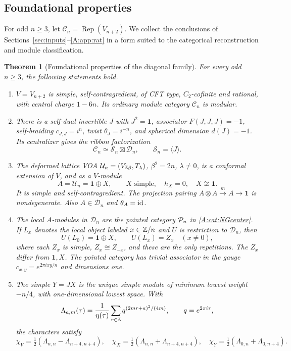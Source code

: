 \documentclass[11pt]{article}
\newtheorem{theorem}{Theorem}[section]
\newcommand{\one}{\mathbf1}\newcommand{\D}{\mathcal D}\newcommand{\Dcat}{\mathcal D}
\newcommand{\Scat}{\mathcal S}\newcommand{\U}{\mathcal U}\newcommand{\bo}{\boxtimes}
\numberwithin{equation}{section}
\begin{document}
\subsection{Foundational properties}\label{A:cat:inputs}
For odd $n\geq3$, let $\mathcal C_n=\operatorname{Rep}(V_{n+2})$. We collect the conclusions of Sections~\ref{sec:inputs}--\ref{A:app:rat} in a form suited to the categorical reconstruction and module classification.
\begin{theorem}[Foundational properties of the diagonal family]\label{E:foundations}
For every odd $n\geq3$, the following statements hold.
\begin{enumerate}[label=(H\arabic*),leftmargin=11mm,itemsep=5pt]
\item $V=V_{n+2}$ is simple, self-contragredient, of CFT type, $C_2$-cofinite and rational, with central charge $1-6n$. Its ordinary module category $\mathcal C_n$ is modular.
\item There is a self-dual invertible $J$ with $J^2=\one$, associator $F(J,J,J)=-1$, self-braiding $c_{J,J}=i^n$, twist $\theta_J=i^{-n}$, and spherical dimension $d(J)=-1$. Its centralizer gives the ribbon factorization
\[
 \mathcal C_n\simeq\Scat_n\bo\D_n,\qquad \Scat_n=\langle J\rangle.
\]
\item The deformed lattice VOA $\mathcal U_n=(V_{\mathbb Z\beta},T_\lambda)$, $\beta^2=2n$, $\lambda\ne0$, is a conformal extension of $V$, and as a $V$-module
\[
 A=\mathcal U_n=\one\oplus X,\qquad X\text{ simple},\quad h_X=0,\quad X\not\cong\one.
\]
It is simple and self-contragredient. The projection pairing $A\otimes A\xrightarrow{m}A\to\one$ is nondegenerate. Also $A\in\D_n$ and $\theta_A=\operatorname{id}$.
\item The local $A$-modules in $\D_n$ are the pointed category $\mathcal P_n$ in \eqref{A:cat:NGcenter}. If $L_x$ denotes the local object labeled $x\in\mathbb Z/n$ and $U$ is restriction to $\D_n$, then
\begin{equation}\label{A:cat:branch}
 U(L_0)=\one\oplus X,\qquad U(L_x)=Z_x\quad(x\ne0),
\end{equation}
where each $Z_x$ is simple, $Z_x\cong Z_{-x}$, and these are the only repetitions. The $Z_x$ differ from $\one,X$. The pointed category has trivial associator in the gauge $c_{x,y}=e^{2\pi ixy/n}$ and dimensions one.
\item The simple $Y=JX$ is the unique simple module of minimum lowest weight $-n/4$, with one-dimensional lowest space. With
\[
 \Lambda_{a,m}(\tau)=\frac{1}{\eta(\tau)}
 \sum_{r\in\mathbb Z}q^{(2mr+a)^2/(4m)},\qquad q=e^{2\pi i\tau},
\]
the characters satisfy
\begin{equation}\label{A:cat:characters}
 \chi_V=\tfrac12(\Lambda_{n,n}-\Lambda_{n+4,n+4}),\quad
 \chi_X=\tfrac12(\Lambda_{n,n}+\Lambda_{n+4,n+4}),\quad
 \chi_Y=\tfrac12(\Lambda_{0,n}+\Lambda_{0,n+4}).
\end{equation}
\end{enumerate}
\end{theorem}
\end{document}
